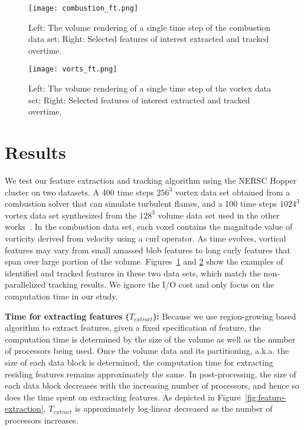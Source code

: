 \begin{figure}[t]
\texttt{[image: combustion\_ft.png]}
\caption{Left: The volume rendering of a single time step of the combustion data set; Right: Selected features of interest extracted and tracked overtime.}
\label{fig:combustion-labeled}
\end{figure}

\begin{figure}[t]
\texttt{[image: vorts\_ft.png]}
\caption{Left: The volume rendering of a single time step of the vortex data set; Right: Selected features of interest extracted and tracked overtime.}
\label{fig:vorts-tracking-result}
\end{figure}

\section{Results}

We test our feature extraction and tracking algorithm using the NERSC Hopper cluster on two datasets. A 400 time steps $256^{3}$ vortex data set obtained from a combustion solver that can simulate turbulent flames, and a 100 time steps $1024^{3}$ vortex data set synthesized from the $128^{3}$ volume data set used in the other works~\cite{Silver1997, Ji2003, Ji2006}. In the combustion data set, each voxel contains the magnitude value of vorticity derived from velocity using a curl operator. As time evolves, vortical features may vary from small amassed blob features to long curly features that span over large portion of the volume. Figures~\ref{fig:combustion-labeled} and \ref{fig:vorts-tracking-result} show the examples of identified and tracked features in these two data sets, which match the non-parallelized tracking results. We ignore the I/O cost and only focus on the computation time in our study.

\textbf{Time for extracting features ($T_{extract}$): } 
Because we use region-growing based algorithm to extract features, given a fixed specification of feature, the computation time is determined by the size of the volume as well as the number of processors being used. Once the volume data and its partitioning, a.k.a. the size of each data block is determined, the computation time for extracting residing features remains approximately the same. In post-processing, the size of each data block decreases with the increasing number of processors, and hence so does the time spent on extracting features. As depicted in Figure~\ref{fig:feature-extraction}, $T_{extract}$ is approximately log-linear decreased as the number of processors increases.

